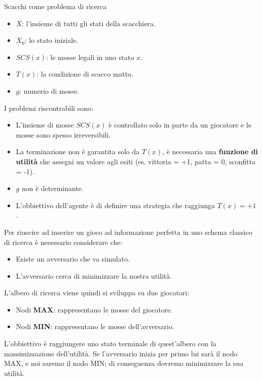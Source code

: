 \begin{esempio}{Scacchi come problema di ricerca}{}
    
    \begin{itemize}
        \item $X$: l'insieme di tutti gli stati della scacchiera.
        \item $X_0$: lo stato iniziale.
        \item $SCS(x)$: le mosse legali in uno stato $x$.
        \item $T(x)$: la condizione di scacco matto.
        \item $g$: numerio di mosse.
    \end{itemize}
    I problemi riscontrabili sono:
    \begin{itemize}
        \item L'insieme di mosse $SCS(x)$ è controllato solo in parte da un
        giocatore e le mosse sono spesso irreversibili.
        \item La terminazione non è garantita solo da $T(x)$, è necessaria
        una \textbf{funzione di utilità} che assegni un valore agli esiti
        (es. vittoria = +1, patta = 0, sconfitta = -1).
        \item $g$ non è determinante.
        \item L'obbiettivo dell'agente è di definire una strategia che raggiunga
        $T(x) = +1$.
    \end{itemize}

\end{esempio}

Per riuscire ad inserire un gioco ad informazione perfetta in uno schema classico
di ricerca è necessario considerare che:
\begin{itemize}
    \item Esiste un avversario che va simulato.
    \item L'avversario cerca di minimizzare la nostra utilità.
\end{itemize}
L'albero di ricerca viene quindi si sviluppa su due giocatori:
\begin{itemize}
    \item Nodi \textbf{MAX}: rappresentano le mosse del giocatore.
    \item Nodi \textbf{MIN}: rappresentano le mosse dell'avversario.
\end{itemize}
L'obbiettivo è raggiungere uno stato terminale di quest'albero con la
massimizzazione dell'utilità.
Se l'avversario inizia per primo lui sarà il nodo MAX, e noi saremo il nodo
MIN; di conseguenza dovremo minimizzare la sua utilità.

